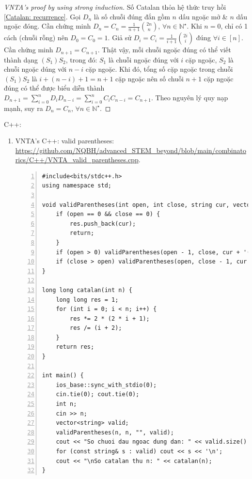\documentclass[oneside]{book}
\begin{document}
\begin{proof}[VNTA's proof by using strong induction]
	Số Catalan thỏa hệ thức truy hồi \eqref{Catalan: recurrence}. Gọi $D_n$ là số chuỗi đúng đắn gồm $n$ dấu ngoặc mở \& $n$ dấu ngoặc đóng. Cần chứng minh $D_n = C_n = \frac{1}{n + 1}\binom{2n}{n}$, $\forall n\in\mathbb{N}^\star$. Khi $n = 0$, chỉ có 1 cách (chuỗi rỗng) nên $D_0 = C_0 = 1$. Giả sử $D_i = C_i = \frac{1}{i + 1}\binom{2i}{i}$ đúng $\forall i\in[n]$. Cần chứng minh $D_{n+1} = C_{n+1}$. Thật vậy, mỗi chuỗi ngoặc đúng có thể viết thành dạng $(S_1)S_2$, trong đó: $S_1$ là chuỗi ngoặc đúng với $i$ cặp ngoặc, $S_2$ là chuỗi ngoặc dúng với $n - i$ cặp ngoặc. Khi đó, tổng số cặp ngoặc trong chuỗi $(S_1)S_2$ là $i + (n - i) + 1 = n + 1$ cặp ngoặc nên số chuỗi $n + 1$ cặp ngoặc đúng có thể được biểu diễn thành $D_{n+1} = \sum_{i=0}^n D_iD_{n - i} = \sum_{i=0}^n C_iC_{n - i} = C_{n+1}$. Theo nguyên lý quy nạp mạnh, suy ra $D_n = C_n$, $\forall n\in\mathbb{N}^\star$.
\end{proof}
C++:
\begin{enumerate}
	\item VNTA's C++: valid parentheses: \url{https://github.com/NQBH/advanced_STEM_beyond/blob/main/combinatorics/C++/VNTA_valid_parentheses.cpp}.
\begin{Verbatim}[numbers=left,xleftmargin=5mm]
#include<bits/stdc++.h>
using namespace std;

void validParentheses(int open, int close, string cur, vector<string>& res) {
    if (open == 0 && close == 0) {
        res.push_back(cur);
        return;
    }
    if (open > 0) validParentheses(open - 1, close, cur + '(', res);
    if (close > open) validParentheses(open, close - 1, cur + ')', res);
}

long long catalan(int n) {
    long long res = 1;
    for (int i = 0; i < n; i++) {
        res *= 2 * (2 * i + 1);
        res /= (i + 2);
    }
    return res;
}

int main() {
    ios_base::sync_with_stdio(0);
    cin.tie(0); cout.tie(0);
    int n;
    cin >> n;
    vector<string> valid;
    validParentheses(n, n, "", valid);
    cout << "So chuoi dau ngoac dung dan: " << valid.size() << '\n';
    for (const string& s : valid) cout << s << '\n';
    cout << "\nSo catalan thu n: " << catalan(n);
}
\end{Verbatim}
\end{enumerate}
\end{document}
